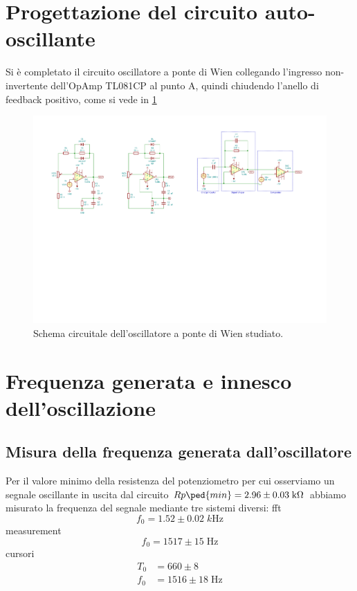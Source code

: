 \documentclass[10pt, a4paper, italian]{article}
\begin{document}
\section{Progettazione del circuito auto-oscillante}
Si è completato il circuito oscillatore a ponte di Wien collegando
l'ingresso non-invertente dell'OpAmp TL081CP al punto A, quindi chiudendo
l'anello di feedback positivo, come si vede in \cref{fig: wienschm}
\begin{figure}[htbp]
    \centering
	\includegraphics[scale=1.2]{wienschm}
    \caption{Schema circuitale dell'oscillatore a ponte di Wien studiato.
    \label{fig: wienschm}}
\end{figure}

\section{Frequenza generata e innesco dell'oscillazione}

\subsection{Misura della frequenza generata dall'oscillatore}
Per il valore minimo della resistenza del potenziometro per cui osserviamo
un segnale oscillante in uscita dal circuito
$Rp\ped{min} = 2.96 \pm 0.03 \; \si{k\ohm}$ abbiamo misurato la frequenza del
segnale mediante tre sistemi diversi:
fft
\[
f_0 = 1.52 \pm 0.02 \; \si{k\Hz}
\]
measurement
\[
f_0 = 1517 \pm 15 \; \si{\Hz}
\]
cursori
\begin{align*}
T_0 &= 660 \pm 8 \\
f_0 &= 1516 \pm 18 \; \si{\Hz}
\end{align*}
\end{document}
